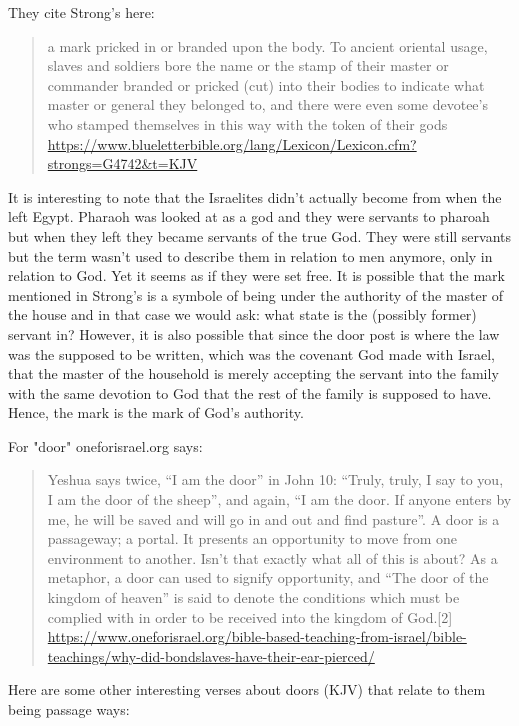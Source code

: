 \documentclass[11pt]{article}
\begin{document}
They cite Strong's here:
\begin{quote}
a mark pricked in or branded upon the body. To ancient oriental usage, slaves and soldiers bore the name or the stamp of their master or commander branded or pricked (cut) into their bodies to indicate what master or general they belonged to, and there were even some devotee's who stamped themselves in this way with the token of their gods \url{https://www.blueletterbible.org/lang/Lexicon/Lexicon.cfm?strongs=G4742&t=KJV}
\end{quote}

It is interesting to note that the Israelites didn't actually become from when the left Egypt. Pharaoh was looked at as a god and they were servants to pharoah but when they left they became servants of the true God. They were still servants but the term wasn't used to describe them in relation to men anymore, only in relation to God. Yet it seems as if they were set free. It is possible that the mark mentioned in Strong's is a symbole of being under the authority of the master of the house and in that case we would ask: what state is the (possibly former) servant in? However, it is also possible that since the door post is where the law was the supposed to be written, which was the covenant God made with Israel, that the master of the household is merely accepting the servant into the family with the same devotion to God that the rest of the family is supposed to have. Hence, the mark is the mark of God's authority. \newline 

\noindent For "door" oneforisrael.org says:
\begin{quote}
Yeshua says twice, “I am the door” in John 10: “Truly, truly, I say to you, I am the door of the sheep”, and again, “I am the door. If anyone enters by me, he will be saved and will go in and out and find pasture”.
A door is a passageway; a portal. It presents an opportunity to move from one environment to another. Isn’t that exactly what all of this is about? As a metaphor, a door can used to signify opportunity, and “The door of the kingdom of heaven” is said to denote the conditions which must be complied with in order to be received into the kingdom of God.[2]
\url{https://www.oneforisrael.org/bible-based-teaching-from-israel/bible-teachings/why-did-bondslaves-have-their-ear-pierced/}
\end{quote}


Here are some other interesting verses about doors (KJV) that relate to them being passage ways:
\end{document}
